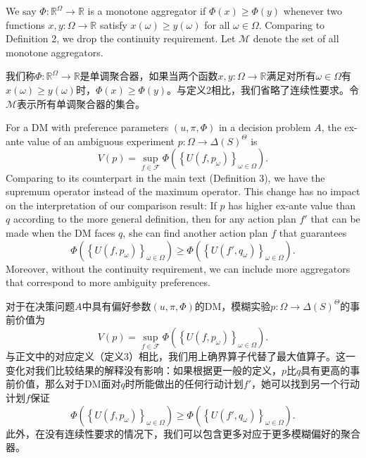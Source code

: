 \documentclass[12pt,a4paper]{article}
\newenvironment{original}
  {\par\vspace{4pt}\noindent\color{black}\ignorespaces}
  {\par\vspace{2pt}}
\newenvironment{translation}
  {\par\vspace{2pt}\noindent\color{myblue}\ignorespaces}
  {\par\vspace{6pt}}
\newcommand{\R}{\mathbb{R}}
\newcommand{\Delt}{\Delta}
\newcommand{\calF}{\mathcal{F}}
\newcommand{\calM}{\mathcal{M}}
\begin{document}
\begin{original}
We say $\Phi:\R^{\Omega}\to\R$ is a monotone aggregator if $\Phi(x)\geq\Phi(y)$ whenever two functions $x,y:\Omega\to\R$ satisfy $x(\omega)\geq y(\omega)$ for all $\omega\in\Omega$. Comparing to Definition 2, we drop the continuity requirement. Let $\calM$ denote the set of all monotone aggregators.
\end{original}

\begin{translation}
我们称$\Phi:\R^{\Omega}\to\R$是单调聚合器，如果当两个函数$x,y:\Omega\to\R$满足对所有$\omega\in\Omega$有$x(\omega)\geq y(\omega)$时，$\Phi(x)\geq\Phi(y)$。与定义2相比，我们省略了连续性要求。令$\calM$表示所有单调聚合器的集合。
\end{translation}

\begin{original}
For a DM with preference parameters $(u,\pi,\Phi)$ in a decision problem $A$, the ex-ante value of an ambiguous experiment $p:\Omega\to\Delt(S)^{\Theta}$ is
\begin{equation}
    V(p) = \sup_{f\in\calF} \Phi\left( \left\{ U(f, p_{\omega}) \right\}_{\omega\in\Omega} \right).
\end{equation}
Comparing to its counterpart in the main text (Definition 3), we have the supremum operator instead of the maximum operator. This change has no impact on the interpretation of our comparison result: If $p$ has higher ex-ante value than $q$ according to the more general definition, then for any action plan $f'$ that can be made when the DM faces $q$, she can find another action plan $f$ that guarantees
\begin{equation}
    \Phi\left( \left\{ U(f, p_{\omega}) \right\}_{\omega\in\Omega} \right) \geq \Phi\left( \left\{ U(f', q_{\omega}) \right\}_{\omega\in\Omega} \right).
\end{equation}
Moreover, without the continuity requirement, we can include more aggregators that correspond to more ambiguity preferences.
\end{original}

\begin{translation}
对于在决策问题$A$中具有偏好参数$(u,\pi,\Phi)$的DM，模糊实验$p:\Omega\to\Delt(S)^{\Theta}$的事前价值为
\begin{equation}
    V(p) = \sup_{f\in\calF} \Phi\left( \left\{ U(f, p_{\omega}) \right\}_{\omega\in\Omega} \right).
\end{equation}
与正文中的对应定义（定义3）相比，我们用上确界算子代替了最大值算子。这一变化对我们比较结果的解释没有影响：如果根据更一般的定义，$p$比$q$具有更高的事前价值，那么对于DM面对$q$时所能做出的任何行动计划$f'$，她可以找到另一个行动计划$f$保证
\begin{equation}
    \Phi\left( \left\{ U(f, p_{\omega}) \right\}_{\omega\in\Omega} \right) \geq \Phi\left( \left\{ U(f', q_{\omega}) \right\}_{\omega\in\Omega} \right).
\end{equation}
此外，在没有连续性要求的情况下，我们可以包含更多对应于更多模糊偏好的聚合器。
\end{translation}
\end{document}
